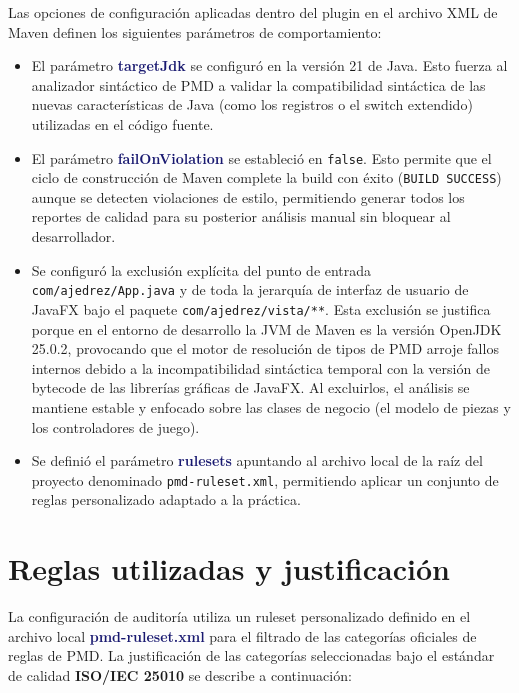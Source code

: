 \documentclass[12pt,a4paper]{article}
\newcommand{\key}[1]{\textbf{\textcolor{MidnightBlue}{#1}}}
\newcommand{\norma}[1]{\textbf{\textcolor{BrickRed}{#1}}}
\begin{document}
Las opciones de configuración aplicadas dentro del plugin en el archivo XML de Maven definen los siguientes parámetros de comportamiento:

\begin{itemize}
    \item El parámetro \key{targetJdk} se configuró en la versión 21 de Java. Esto fuerza al analizador sintáctico de PMD a validar la compatibilidad sintáctica de las nuevas características de Java (como los registros o el switch extendido) utilizadas en el código fuente.
    \item El parámetro \key{failOnViolation} se estableció en \texttt{false}. Esto permite que el ciclo de construcción de Maven complete la build con éxito (\texttt{BUILD SUCCESS}) aunque se detecten violaciones de estilo, permitiendo generar todos los reportes de calidad para su posterior análisis manual sin bloquear al desarrollador.
    \item Se configuró la exclusión explícita del punto de entrada \texttt{com/ajedrez/App.java} y de toda la jerarquía de interfaz de usuario de JavaFX bajo el paquete \texttt{com/ajedrez/vista/**}. Esta exclusión se justifica porque en el entorno de desarrollo la JVM de Maven es la versión OpenJDK 25.0.2, provocando que el motor de resolución de tipos de PMD arroje fallos internos debido a la incompatibilidad sintáctica temporal con la versión de bytecode de las librerías gráficas de JavaFX. Al excluirlos, el análisis se mantiene estable y enfocado sobre las clases de negocio (el modelo de piezas y los controladores de juego).
    \item Se definió el parámetro \key{rulesets} apuntando al archivo local de la raíz del proyecto denominado \texttt{pmd-ruleset.xml}, permitiendo aplicar un conjunto de reglas personalizado adaptado a la práctica.
\end{itemize}

\section{Reglas utilizadas y justificación}

La configuración de auditoría utiliza un ruleset personalizado definido en el archivo local \key{pmd-ruleset.xml} para el filtrado de las categorías oficiales de reglas de PMD. La justificación de las categorías seleccionadas bajo el estándar de calidad \norma{ISO/IEC 25010} se describe a continuación:
\end{document}
